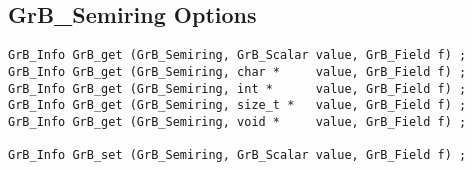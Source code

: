 \newpage
\subsection{{\sf GrB\_Semiring} Options}
\label{get_set_semiring}

\begin{mdframed}[userdefinedwidth=6in]
{\footnotesize
\begin{verbatim}
GrB_Info GrB_get (GrB_Semiring, GrB_Scalar value, GrB_Field f) ;
GrB_Info GrB_get (GrB_Semiring, char *     value, GrB_Field f) ;
GrB_Info GrB_get (GrB_Semiring, int *      value, GrB_Field f) ;
GrB_Info GrB_get (GrB_Semiring, size_t *   value, GrB_Field f) ;
GrB_Info GrB_get (GrB_Semiring, void *     value, GrB_Field f) ;

GrB_Info GrB_set (GrB_Semiring, GrB_Scalar value, GrB_Field f) ;
\end{verbatim}
}\end{mdframed}


